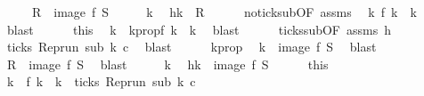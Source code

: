 \begin{isabellebody}
\ \ \ \ {\isacharparenleft}\ {\isacartoucheopen}{\isacharquery}R\ {\isacharequal}\ image\ f\ {\isacharquery}S{\isacartoucheclose}{\isacharparenright}\isanewline
%
\isadelimproof
%
\endisadelimproof
%
\isatagproof
{}\isamarkupfalse%
\isanewline
\ \ \isacommand{{\isacharbraceleft}}\isamarkupfalse%
\ \isamarkupfalse%
\ k\ \isamarkupfalse%
\ h{\isacharcolon}{\isacartoucheopen}k\ {\isasymin}\ {\isacharquery}R{\isacartoucheclose}\isanewline
\ \ \ \ \isamarkupfalse%
\ no{\isacharunderscore}tick{\isacharunderscore}sub{\isacharbrackleft}OF\ assms{\isacharbrackright}\ \isamarkupfalse%
\ {\isacartoucheopen}{\isasymexists}k\ f\ k\ {\isacharequal}\ k{\isacartoucheclose}\ \isamarkupfalse%
\ blast\isanewline
\ \ \ \ \isamarkupfalse%
\ this\ \isamarkupfalse%
\ k\ \ k{}prop{\isacharcolon}{\isacartoucheopen}f\ k\ {\isacharequal}\ k{\isacartoucheclose}\ \isamarkupfalse%
\ blast\isanewline
\ \ \ \ \isamarkupfalse%
\ ticks{\isacharunderscore}sub{\isacharbrackleft}OF\ assms{\isacharbrackright}\ h\ \isamarkupfalse%
\ {\isacartoucheopen}ticks\ {\isacharparenleft}{\isacharparenleft}Rep{\isacharunderscore}run\ sub{\isacharparenright}\ k\ c{\isacharparenright}{\isacartoucheclose}\ \isamarkupfalse%
\ blast\isanewline
\ \ \ \ \isamarkupfalse%
\ k{}prop\ \isamarkupfalse%
\ {\isacartoucheopen}k\ {\isasymin}\ image\ f\ {\isacharquery}S{\isacartoucheclose}\ \isamarkupfalse%
\ blast\isanewline
\ \ \isacommand{{\isacharbraceright}}\isamarkupfalse%
\isanewline
\ \ \isamarkupfalse%
\ {\isacartoucheopen}{\isacharquery}R\ {\isasymsubseteq}\ image\ f\ {\isacharquery}S{\isacartoucheclose}\ \isamarkupfalse%
\ blast\isanewline
{}\isamarkupfalse%
\isanewline
\ \ \isacommand{{\isacharbraceleft}}\isamarkupfalse%
\ \isamarkupfalse%
\ k\ \isamarkupfalse%
\ h{\isacharcolon}{\isacartoucheopen}k\ {\isasymin}\ image\ f\ {\isacharquery}S{\isacartoucheclose}\isanewline
\ \ \ \ \isamarkupfalse%
\ this\ \isamarkupfalse%
\ k\ \ {\isacartoucheopen}f\ k\ {\isacharequal}\ k\ {\isasymand}\ ticks\ {\isacharparenleft}{\isacharparenleft}Rep{\isacharunderscore}run\ sub{\isacharparenright}\ k\ c{\isacharparenright}{\isacartoucheclose}\ \isamarkupfalse%

\end{isabellebody}
